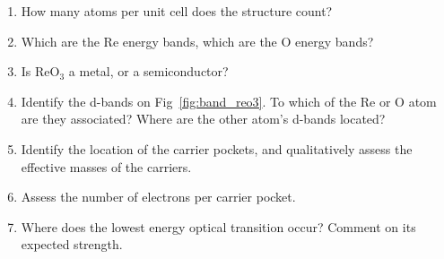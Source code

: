 \begin{enumerate}[label=(\roman*)]
\item How many atoms per unit cell does the structure count?
\item Which are the Re energy bands, which are the O energy bands?
\item Is ReO$_3$ a metal, or a semiconductor?
\item Identify the d-bands on Fig~\ref{fig:band_reo3}. To which of the Re
  or O atom are they associated? Where are the other atom's d-bands
  located?
\item Identify the location of the carrier pockets, and qualitatively assess the
  effective masses of the carriers.
\item Assess the number of electrons per carrier pocket.
\item Where does the lowest energy optical transition occur? Comment
  on its expected strength.
\end{enumerate}


